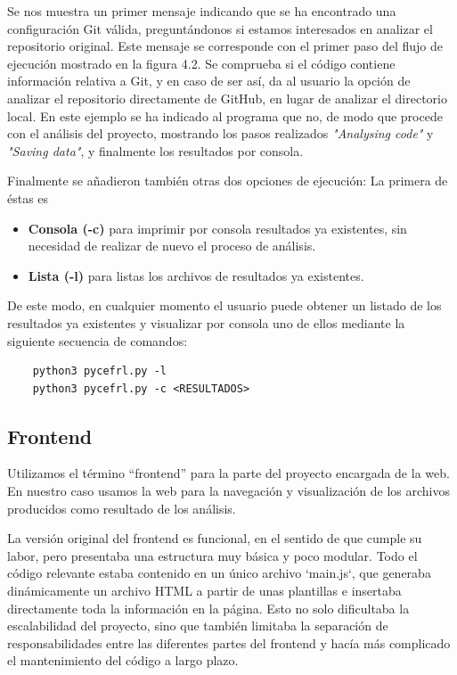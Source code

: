\documentclass[a4paper, 12pt]{book}
\begin{document}
Se nos muestra un primer mensaje indicando que se ha encontrado una configuración Git válida, preguntándonos si estamos interesados en analizar el repositorio original. Este mensaje se corresponde con el primer paso del flujo de ejecución mostrado en la figura 4.2. Se comprueba si el código contiene información relativa a Git, y en caso de ser así, da al usuario la opción de analizar el repositorio directamente de GitHub, en lugar de analizar el directorio local. En este ejemplo se ha indicado al programa que no, de modo que procede con el análisis del proyecto, mostrando los pasos realizados \textit{"Analysing code"} y \textit{"Saving data"}, y finalmente los resultados por consola.

Finalmente se añadieron también otras dos opciones de ejecución: La primera de éstas es 

\begin{itemize}
    \item \textbf{Consola (-c)} para imprimir por consola resultados ya existentes, sin necesidad de realizar de nuevo el proceso de análisis.
    \item \textbf{Lista (-l)} para listas los archivos de resultados ya existentes.
\end{itemize}

De este modo, en cualquier momento el usuario puede obtener un listado de los resultados ya existentes y visualizar por consola uno de ellos mediante la siguiente secuencia de comandos:

\begin{verbatim}
    python3 pycefrl.py -l
    python3 pycefrl.py -c <RESULTADOS>
\end{verbatim}

\subsection{Frontend}

Utilizamos el término ``frontend'' para la parte del proyecto encargada de la web. En nuestro caso usamos la web para la navegación y visualización de los archivos producidos como resultado de los análisis.

La versión original del frontend es funcional, en el sentido de que cumple su labor, pero presentaba una estructura muy básica y poco modular. Todo el código relevante estaba contenido en un único archivo `main.js`, que generaba dinámicamente un archivo HTML a partir de unas plantillas e insertaba directamente toda la información en la página. Esto no solo dificultaba la escalabilidad del proyecto, sino que también limitaba la separación de responsabilidades entre las diferentes partes del frontend y hacía más complicado el mantenimiento del código a largo plazo.
\end{document}

